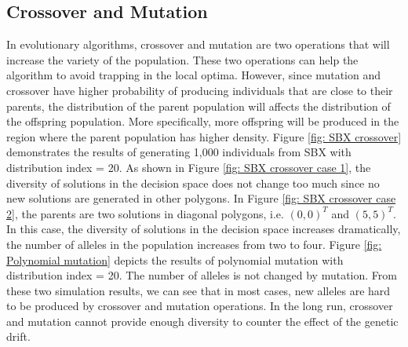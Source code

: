 \documentclass[conference]{IEEEtran}
\begin{document}
\subsection{Crossover and Mutation}
In evolutionary algorithms, crossover and mutation are two operations that will increase the variety of the population. These two operations can help the algorithm to avoid trapping in the local optima. However, since mutation and crossover have higher probability of producing individuals that are close to their parents, the distribution of the parent population will affects the distribution of the offspring population. More specifically, more offspring will be produced in the region where the parent population has higher density. Figure \ref{fig: SBX crossover} demonstrates the results of generating 1,000 individuals from SBX\cite{SBX} with distribution index = 20. As shown in Figure \ref{fig: SBX crossover case 1}, the diversity of solutions in the decision space does not change too much since no new solutions are generated in other polygons. In Figure \ref{fig: SBX crossover case 2}, the parents are two solutions in diagonal polygons, i.e. $(0, 0)^T$ and $(5, 5)^T$. In this case, the diversity of solutions in the decision space increases dramatically, the number of alleles in the population increases from two to four. Figure \ref{fig: Polynomial mutation} depicts the results of polynomial mutation with distribution index = 20. The number of alleles is not changed by mutation. From these two simulation results, we can see that in most cases, new alleles are hard to be produced by crossover and mutation operations. In the long run, crossover and mutation cannot provide enough diversity to counter the effect of the genetic drift. 
\end{document}
